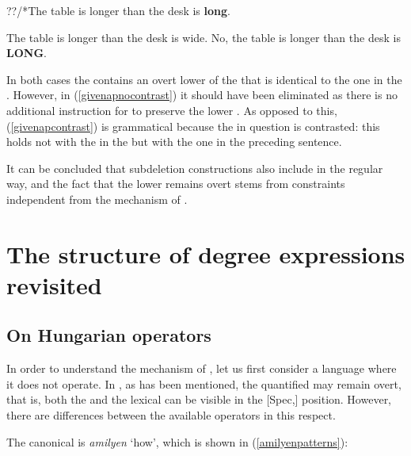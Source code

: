 \begin{exe}
\ex \label{givenap}
\begin{xlist} 
\ex ??/*The table is longer than the desk is \textbf{long}. \label{givenapnocontrast}
\ex \label{givenapcontrast}
\begin{xlist}
 The table is longer than the desk is wide.
 No, the table is longer than the desk is \textbf{LONG}.
\end{xlist}
\end{xlist}
\end{exe}
	
In both cases the  contains an overt lower  of the  that is identical to the one in the . However, in (\ref{givenapnocontrast}) it should have been eliminated as there is no additional instruction for  to preserve the lower . As opposed to this, (\ref{givenapcontrast}) is grammatical because the  in question is contrasted: this  holds not with the  in the  but with the one in the preceding sentence.

It can be concluded that subdeletion constructions also include  in the regular way, and the fact that the lower  remains overt stems from constraints independent from the mechanism of .

\section{The structure of degree expressions revisited} \label{sec:3structure}
\subsection{On Hungarian operators} \label{sec:3hungarian}
In order to understand the mechanism of , let us first consider a language where it does not operate. In , as has been mentioned, the quantified  may remain overt, that is, both the  and the lexical  can be visible in the [Spec,] position. However, there are differences between the available operators in this respect.

The canonical  is \textit{amilyen} `how', which is shown in (\ref{amilyenpatterns}):

\ea \label{amilyenpatterns}
\z
\z

